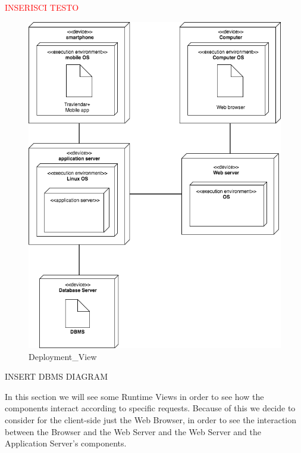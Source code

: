 \textcolor{red}{\Huge INSERISCI TESTO}
\begin{figure}[H]
	\centering
	\includegraphics[scale=0.17]{Images/Architecture/Deployment_View}
	\caption{Deployment\_View}
\end{figure}


INSERT DBMS DIAGRAM

In this section we will see some Runtime Views in order to see how the components interact according to specific requests.
Because of this we decide to consider for the client-side just the Web Browser, in order to see the interaction between the Browser and the Web Server and the Web Server and the Application Server's components.

